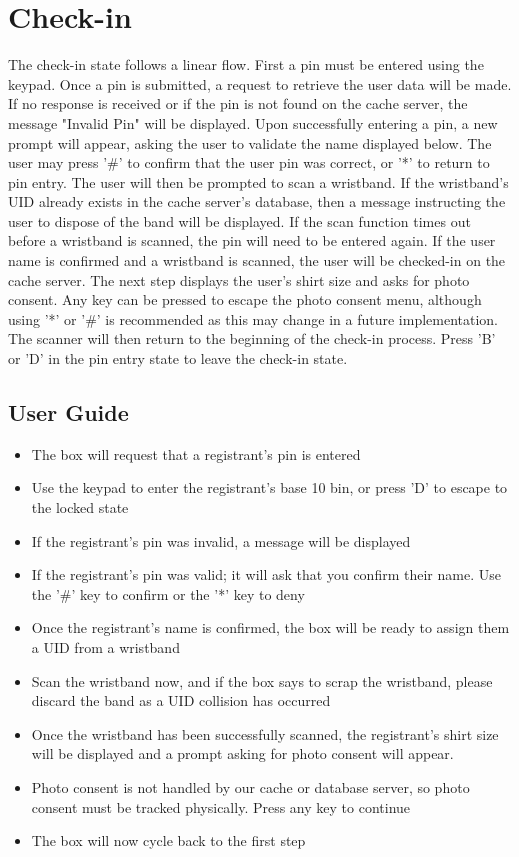 \documentclass{article}
\begin{document}
\section{Check-in}
The check-in state follows a linear flow.  First a pin must be entered using the keypad.  Once a pin is submitted, a request to retrieve the user data will be made.  If no response is received or if the pin is not found on the cache server, the message "Invalid Pin" will be displayed.  Upon successfully entering a pin, a new prompt will appear, asking the user to validate the name displayed below.  The user may press '\#' to confirm that the user pin was correct, or '*' to return to pin entry.  The user will then be prompted to scan a wristband.  If the wristband's UID already exists in the cache server's database, then a message instructing the user to dispose of the band will be displayed.  If the scan function times out before a wristband is scanned, the pin will need to be entered again. If the user name is confirmed and a wristband is scanned, the user will be checked-in on the cache server.  The next step displays the user's shirt size and asks for photo consent.  Any key can be pressed to escape the photo consent menu, although using '*' or '\#' is recommended as this may change in a future implementation.  The scanner will then return to the beginning of the check-in process.  Press 'B' or 'D' in the pin entry state to leave the check-in state. 
\subsection{User Guide}
\begin{itemize}
	\item The box will request that a registrant's pin is entered
	\item Use the keypad to enter the registrant's base 10 bin, or press 'D' to escape to the locked state
	\item If the registrant's pin was invalid, a message will be displayed
	\item If the registrant's pin was valid; it will ask that you confirm their name.  Use the '\#' key to confirm or the '*' key to deny
	\item Once the registrant's name is confirmed, the box will be ready to assign them a UID from a wristband
	\item Scan the wristband now, and if the box says to scrap the wristband, please discard the band as a UID collision has occurred
	\item Once the wristband has been successfully scanned, the registrant's shirt size will be displayed and a prompt asking for photo consent will appear.
	\item Photo consent is not handled by our cache or database server, so photo consent must be tracked physically.  Press any key to continue
	\item The box will now cycle back to the first step
\end{itemize}
\end{document}
